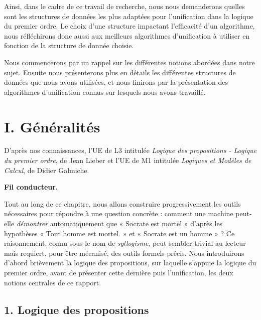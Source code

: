 \documentclass[11pt]{article}
\newenvironment{avantpropos}{%
    \begin{mdframed}[
        linecolor=sectioncolor!40,
        linewidth=0.8pt,
        backgroundcolor=sectioncolor!5,
        innerleftmargin=10pt,
        innerrightmargin=10pt,
        innertopmargin=6pt,
        innerbottommargin=6pt,
        skipabove=8pt,
        skipbelow=8pt
    ]
    \noindent\textbf{\small\color{sectioncolor}}\enspace\small\itshape
}{%
    \end{mdframed}
}
\begin{document}
Ainsi, dans le cadre de ce travail de recherche, nous nous demanderons quelles sont les structures de données les plus adaptées pour l'unification dans la logique du premier ordre. Le choix d'une structure impactant l'efficacité d'un algorithme, nous réfléchirons donc aussi aux meilleurs algorithmes d'unification à utiliser en fonction de la structure de donnée choisie.

\vspace{0.5cm}

Nous commencerons par un rappel sur les différentes notions abordées dans notre sujet. Ensuite nous présenterons plus en détails les différentes structures de données que nous avons utilisées, et nous finirons par la présentation des algorithmes d'unification connus sur lesquels nous avons travaillé.

\newpage
\section*{I. Généralités}
{}
\label{generalites}

\begin{avantpropos}
    D'après nos connaissances, l'UE de L3 intitulée \emph{Logique des propositions - Logique du premier ordre}, de Jean Lieber et l'UE de M1 intitulée \emph{Logiques et Modèles de Calcul}, de Didier Galmiche.
\end{avantpropos}

\vspace{0.4cm}
\noindent\textbf{Fil conducteur.}
\vspace{0.4cm}

Tout au long de ce chapitre, nous allons construire progressivement les outils nécessaires pour répondre à une question concrète : comment une machine peut-elle \emph{démontrer} automatiquement que « Socrate est mortel » d'après les hypothèses « Tout homme est mortel. » et « Socrate est un homme » ? Ce raisonnement, connu sous le nom de \textit{syllogisme}, peut sembler trivial au lecteur mais requiert,  pour être mécanisé, des outils formels précis. Nous introduirons d'abord brièvement la logique des propositions, sur laquelle s'appuie la logique du premier ordre, avant de présenter cette dernière puis l'unification, les deux notions centrales de ce rapport.
\vspace{0.4cm}


\subsection*{1. Logique des propositions}
\label{lp}
\vspace{0.4cm}
\end{document}
